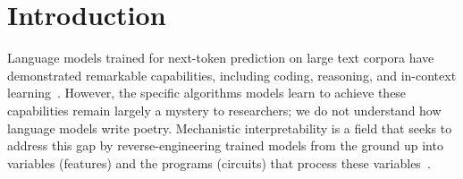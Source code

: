 \documentclass{article} %
\theoremstyle{plain}
\theoremstyle{definition}
\begin{document}







\section{Introduction}

Language models trained for next-token prediction on large text corpora have demonstrated remarkable capabilities, including coding, reasoning, and in-context learning~\citep{sparks_of_agi, gpt_4_tech_report, claude_3_tech_report, gemini_tech_report}. However, the specific algorithms models learn to achieve these capabilities remain largely a mystery to researchers; we do not understand how language models write poetry. Mechanistic interpretability is a field that seeks to address this gap by reverse-engineering trained models from the ground up into variables (features) and the programs (circuits) that process these variables~\citep{olah2020zoom}.
\end{document}
